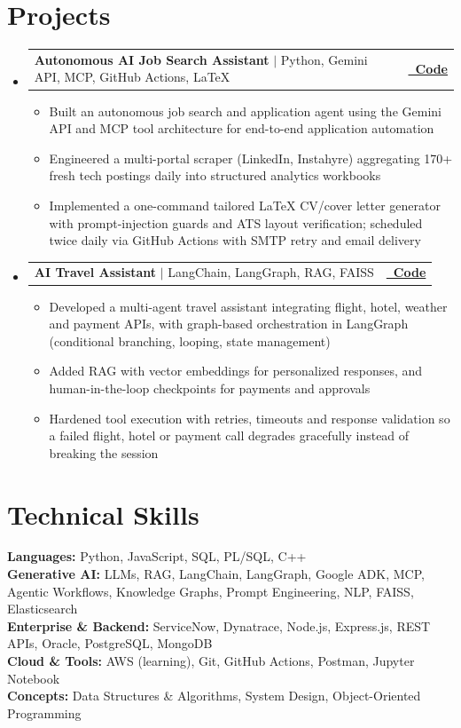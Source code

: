 \documentclass[a4paper,11pt]{article}
\makeatletter
\newcommand{\resumeItem}[1]{
  \item\small{{#1 \vspace{-2pt}}}
}
\newcommand{\resumeProjectHeading}[2]{
  \item
  \begin{tabular*}{1.0\textwidth}{l@{\extracolsep{\fill}}r}
    \small#1 & \textbf{\small #2} \\
  \end{tabular*}\vspace{-7pt}
}
\newcommand{\resumeSubHeadingListStart}{\begin{itemize}[leftmargin=0.0in, label={}]}
\newcommand{\resumeSubHeadingListEnd}{\end{itemize}}
\newcommand{\resumeItemListStart}{\begin{itemize}[leftmargin=0.15in, itemsep=0pt, topsep=2pt]}
\newcommand{\resumeItemListEnd}{\end{itemize}\vspace{-6pt}}
\makeatother
\begin{document}
\section{Projects}
\resumeSubHeadingListStart

\resumeProjectHeading
{\textbf{Autonomous AI Job Search Assistant} $|$ Python, Gemini API, MCP, GitHub Actions, LaTeX}
{\href{https://github.com/Akm007git/ai-job-search}{\faGithub\ Code}}
\resumeItemListStart
\resumeItem{Built an autonomous job search and application agent using the Gemini API and MCP tool architecture for end-to-end application automation}
\resumeItem{Engineered a multi-portal scraper (LinkedIn, Instahyre) aggregating 170+ fresh tech postings daily into structured analytics workbooks}
\resumeItem{Implemented a one-command tailored LaTeX CV/cover letter generator with prompt-injection guards and ATS layout verification; scheduled twice daily via GitHub Actions with SMTP retry and email delivery}
\resumeItemListEnd

\resumeProjectHeading
{\textbf{AI Travel Assistant} $|$ LangChain, LangGraph, RAG, FAISS}
{\href{https://github.com/Akm007git}{\faGithub\ Code}}
\resumeItemListStart
\resumeItem{Developed a multi-agent travel assistant integrating flight, hotel, weather and payment APIs, with graph-based orchestration in LangGraph (conditional branching, looping, state management)}
\resumeItem{Added RAG with vector embeddings for personalized responses, and human-in-the-loop checkpoints for payments and approvals}
\resumeItem{Hardened tool execution with retries, timeouts and response validation so a failed flight, hotel or payment call degrades gracefully instead of breaking the session}
\resumeItemListEnd

\resumeSubHeadingListEnd
\vspace{-5pt}

\section{Technical Skills}
\begin{itemize}[leftmargin=0.15in, label={}, itemsep=0pt, topsep=2pt]
\small{\item{
\textbf{Languages:} Python, JavaScript, SQL, PL/SQL, C++ \\
\vspace{2pt}
\textbf{Generative AI:} LLMs, RAG, LangChain, LangGraph, Google ADK, MCP, Agentic Workflows, Knowledge Graphs, Prompt Engineering, NLP, FAISS, Elasticsearch \\
\vspace{2pt}
\textbf{Enterprise \& Backend:} ServiceNow, Dynatrace, Node.js, Express.js, REST APIs, Oracle, PostgreSQL, MongoDB \\
\vspace{2pt}
\textbf{Cloud \& Tools:} AWS (learning), Git, GitHub Actions, Postman, Jupyter Notebook \\
\vspace{2pt}
\textbf{Concepts:} Data Structures \& Algorithms, System Design, Object-Oriented Programming
}}
\end{itemize}
\end{document}
